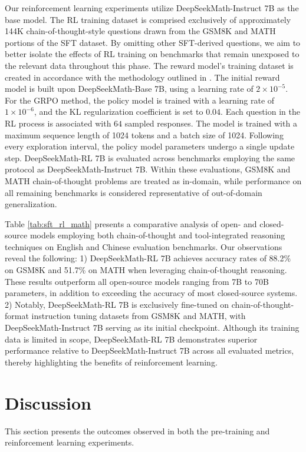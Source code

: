 \begin{itemize}[topsep=0pt]
\begin{itemize}[topsep=0pt]
Our reinforcement learning experiments utilize DeepSeekMath-Instruct 7B as the base model. The RL training dataset is comprised exclusively of approximately 144K chain-of-thought-style questions drawn from the GSM8K and MATH portions of the SFT dataset. By omitting other SFT-derived questions, we aim to better isolate the effects of RL training on benchmarks that remain unexposed to the relevant data throughout this phase. The reward model’s training dataset is created in accordance with the methodology outlined in \citep{wang2023math}. The initial reward model is built upon DeepSeekMath-Base 7B, using a learning rate of $2\times10^{-5}$. For the GRPO method, the policy model is trained with a learning rate of $1\times10^{-6}$, and the KL regularization coefficient is set to $0.04$. Each question in the RL process is associated with $64$ sampled responses. The model is trained with a maximum sequence length of 1024 tokens and a batch size of 1024. Following every exploration interval, the policy model parameters undergo a single update step. DeepSeekMath-RL 7B is evaluated across benchmarks employing the same protocol as DeepSeekMath-Instruct 7B. Within these evaluations, GSM8K and MATH chain-of-thought problems are treated as in-domain, while performance on all remaining benchmarks is considered representative of out-of-domain generalization.

Table \ref{tab:sft_rl_math} presents a comparative analysis of open- and closed-source models employing both chain-of-thought and tool-integrated reasoning techniques on English and Chinese evaluation benchmarks. Our observations reveal the following: 1) DeepSeekMath-RL 7B achieves accuracy rates of 88.2\% on GSM8K and 51.7\% on MATH when leveraging chain-of-thought reasoning. These results outperform all open-source models ranging from 7B to 70B parameters, in addition to exceeding the accuracy of most closed-source systems. 2) Notably, DeepSeekMath-RL 7B is exclusively fine-tuned on chain-of-thought-format instruction tuning datasets from GSM8K and MATH, with DeepSeekMath-Instruct 7B serving as its initial checkpoint. Although its training data is limited in scope, DeepSeekMath-RL 7B demonstrates superior performance relative to DeepSeekMath-Instruct 7B across all evaluated metrics, thereby highlighting the benefits of reinforcement learning.

\section{Discussion}
This section presents the outcomes observed in both the pre-training and reinforcement learning experiments.


\end{itemize}
\end{itemize}
